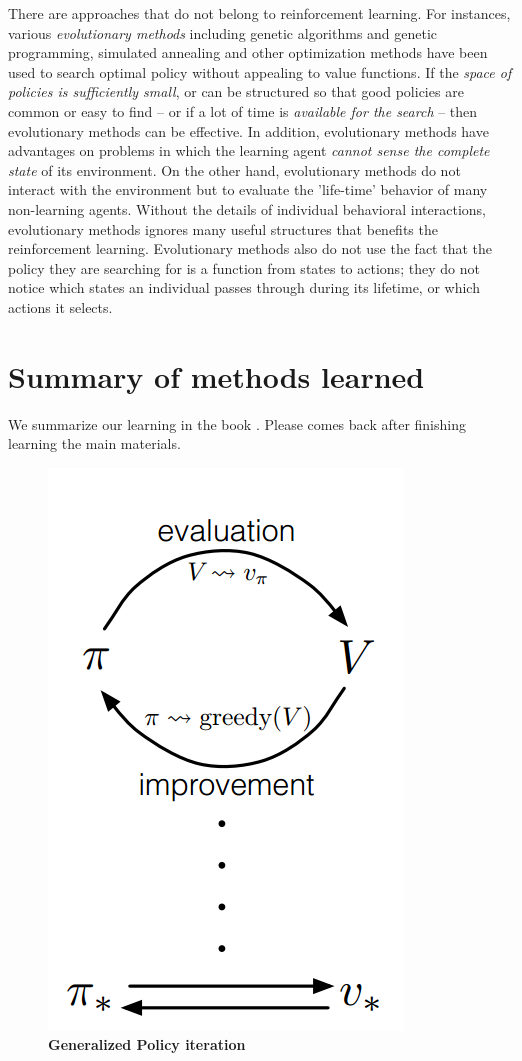 \documentclass[11pt]{article}
\begin{document}
There are approaches that do not belong to reinforcement learning. For instances, various \emph{evolutionary methods} including genetic algorithms and genetic programming, simulated annealing and other optimization methods have been used to search optimal policy without appealing to value functions. If the \emph{space of policies is sufficiently small}, or can be structured so that good policies are common or easy to find -- or if a lot of time is \emph{available for the search} -- then evolutionary methods can be effective.  In addition, evolutionary methods have advantages on problems in which the learning agent \emph{cannot sense the complete state} of its environment. On the other hand,  evolutionary methods do not interact with the environment but to evaluate the 'life-time' behavior of many non-learning agents.  Without the details of individual behavioral interactions, evolutionary methods ignores many useful structures that benefits the reinforcement learning.   Evolutionary methods also do not use the fact that the policy they are searching for is a function from states to actions; they do not notice which states an individual passes through during its lifetime, or which actions it selects. 

\section{Summary of methods learned}
We summarize our learning in the book \citep{sutton2018reinforcement}. Please comes back after finishing learning the main materials. 
\begin{figure}
\begin{minipage}[t]{1\linewidth}
  \centering
  \centerline{\includegraphics[scale = 0.3]{GPI.png}}
\end{minipage}
\caption{\footnotesize{\textbf{Generalized Policy iteration}}}
\label{fig: GPI}
\end{figure}
\end{document}
